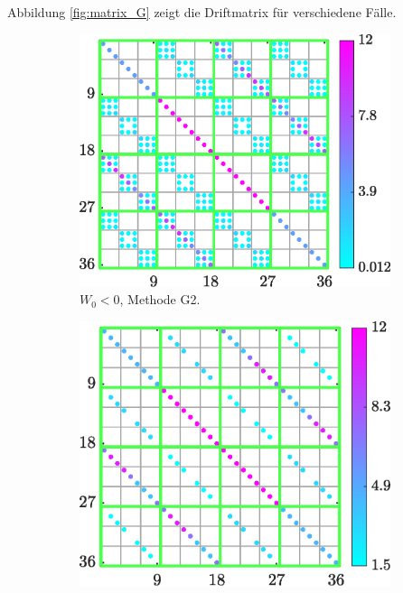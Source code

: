 Abbildung \ref{fig:matrix_G} zeigt die Driftmatrix für verschiedene Fälle.
\begin{figure}
    \centering
    \begin{subfigure}[b]{0.488\textwidth}
        \centering
        \includegraphics[width=\textwidth]{plots/absG_glob_w_GL_w_CAP.eps}
        \caption[]%
        {{\small $W_0<0$, Methode G2.}}
        \label{fig:G_1}
    \end{subfigure}
    \hfill
    \begin{subfigure}[b]{0.462\textwidth}
        \centering
        \includegraphics[width=\textwidth]{plots/absG_glob_wo_GL_w_CAP.eps}

\end{subfigure}
\end{figure}
